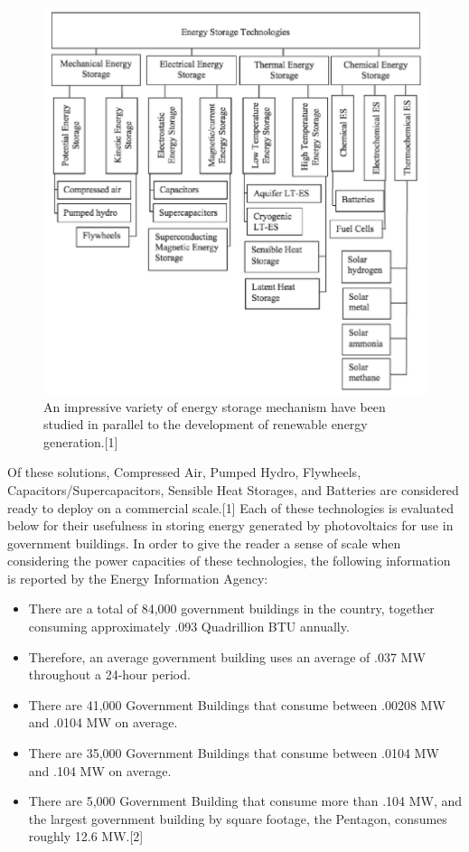 \begin{figure}
\begin{center}
\includegraphics[scale=0.6]{pics/PatrickFigure1.png}
\caption{An impressive variety of energy storage mechanism have been studied in
parallel to the development of renewable energy generation.[1] }
\label{p1}
\end{center}
\end{figure}

Of these solutions, Compressed Air, Pumped Hydro, Flywheels,
Capacitors/Supercapacitors, Sensible Heat Storages, and Batteries are
considered ready to deploy on a commercial scale.[1] Each of these technologies
is evaluated below for their usefulness in storing energy generated by
photovoltaics for use in government buildings. In order to give the reader a
sense of scale when considering the power capacities of these technologies, the
following information is reported by the Energy Information Agency:
\begin{itemize}
\item There are a total of 84,000 government buildings in the country, together
consuming approximately .093 Quadrillion BTU annually.
\item Therefore, an average government building uses an average of .037 MW
throughout a 24-hour period.
\item There are 41,000 Government Buildings that consume between .00208 MW and
.0104 MW on average.
\item There are 35,000 Government Buildings that consume between .0104 MW and
.104 MW on average.
\item There are 5,000 Government Building that consume more than .104 MW, and
the largest government building by square footage, the Pentagon, consumes roughly
12.6 MW.[2]
\end{itemize}


